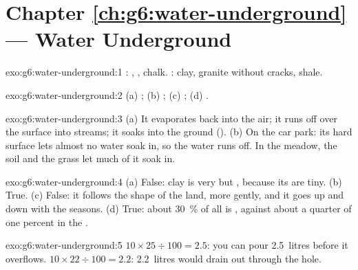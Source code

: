 \section*{Chapter \ref{ch:g6:water-underground} --- Water Underground}

\begin{solution}{exo:g6:water-underground:1}
: , , chalk. : clay, granite without cracks,
shale.
\end{solution}

\begin{solution}{exo:g6:water-underground:2}
(a) ; (b) ; (c) ; (d) .
\end{solution}

\begin{solution}{exo:g6:water-underground:3}
(a) It evaporates back into the air; it runs off over the surface into
streams; it soaks into the ground (). (b) On the car park: its
hard surface lets almost no water soak in, so the water runs off. In the
meadow, the soil and the grass let much of it soak in.
\end{solution}

\begin{solution}{exo:g6:water-underground:4}
(a) False: clay is very  but , because its  are tiny.
(b) True. (c) False: it follows the shape of the land, more gently, and it
goes up and down with the seasons. (d) True: about 30~\% of all 
is , against about a quarter of one percent in the .
\end{solution}

\begin{solution}{exo:g6:water-underground:5}
$10 \times 25 \div 100 = 2.5$: you can pour 2.5~litres before it overflows.
$10 \times 22 \div 100 = 2.2$: 2.2~litres would drain out through the hole.
\end{solution}

